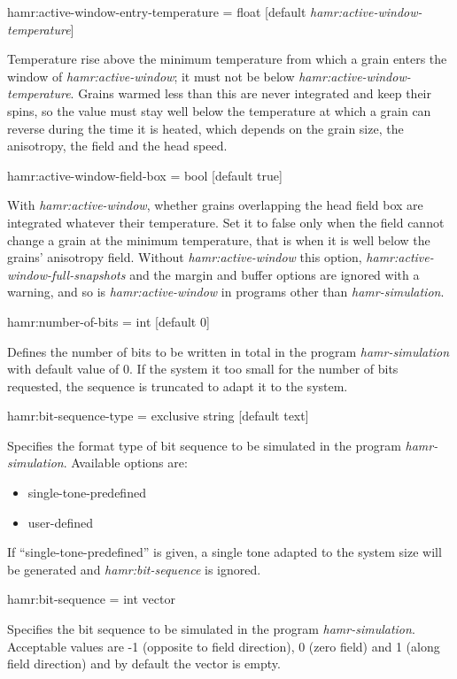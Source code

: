 {\zicf hamr:active-window-entry-temperature = float [default \textit{hamr:active-window-temperature}]}
Temperature rise above the minimum temperature from which a grain enters the window of \textit{hamr:active-window}; it must not be below \textit{hamr:active-window-temperature}. Grains warmed less than this are never integrated and keep their spins, so the value must stay well below the temperature at which a grain can reverse during the time it is heated, which depends on the grain size, the anisotropy, the field and the head speed.

{\zicf hamr:active-window-field-box = bool [default true]}
With \textit{hamr:active-window}, whether grains overlapping the head field box are integrated whatever their temperature. Set it to false only when the field cannot change a grain at the minimum temperature, that is when it is well below the grains' anisotropy field. Without \textit{hamr:active-window} this option, \textit{hamr:active-window-full-snapshots} and the margin and buffer options are ignored with a warning, and so is \textit{hamr:active-window} in programs other than \textit{hamr-simulation}.

{\zicf hamr:number-of-bits = int [default $0$]}
Defines the number of bits to be written in total in the program \textit{hamr-simulation} with default value of 0.
If the system it too small for the number of bits requested, the sequence is truncated to adapt it to the system.

{\zicf hamr:bit-sequence-type =  exclusive string [default text]}
Specifies the format type of bit sequence to be simulated in the program \textit{hamr-simulation}. Available options are:
\begin{itemize}
	\item[] single-tone-predefined
	\item[] user-defined
\end{itemize}
If ``single-tone-predefined'' is given, a single tone adapted to the system size will be generated and \textit{ hamr:bit-sequence} is ignored.

{\zicf hamr:bit-sequence = int vector}
Specifies the bit sequence to be simulated in the program \textit{hamr-simulation}.
Acceptable values are -1 (opposite to field direction), 0 (zero field) and 1 (along field direction) and by default the vector is empty.


